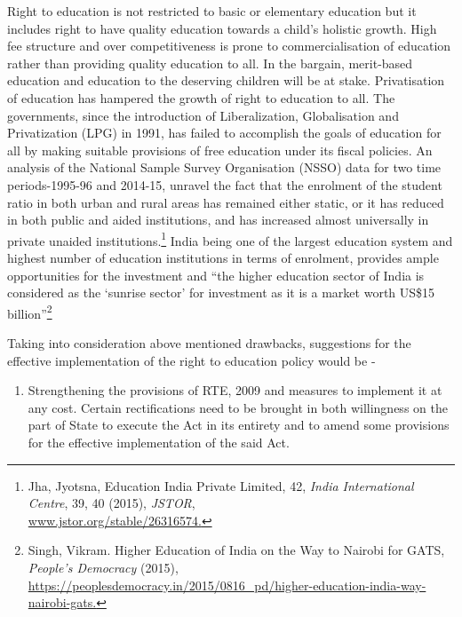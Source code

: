\begin{multicols}{2}
\vspace{-.1cm}


\vspace{-.1cm}

\noi
Right to education is not restricted to basic or elementary education but it includes right to
have quality education towards a child’s holistic growth. High fee structure and over
competitiveness is prone to commercialisation of education rather than providing quality
education to all. In the bargain, merit-based education and education to the deserving children
will be at stake. Privatisation of education has hampered the growth of right to education to
all. The governments, since the introduction of Liberalization, Globalisation and Privatization
(LPG) in 1991, has failed to accomplish the goals of education for all by making suitable
provisions of free education under its fiscal policies. An analysis of the National Sample
Survey Organisation (NSSO) data for two time periods-1995-96 and 2014-15, unravel the
fact that the enrolment of the student ratio in both urban and rural areas has remained either
static, or it has reduced in both public and aided institutions, and has increased almost
universally in private unaided institutions.\footnote{Jha, Jyotsna, Education India Private Limited, 42, \textit{India International Centre}, 39, 40 (2015), \textit{JSTOR},\\ \url{www.jstor.org/stable/26316574.}} India being one of the largest education system and highest number of education institutions in terms of enrolment, provides ample
opportunities for the investment and “the higher education sector of India is considered as the
‘sunrise sector’ for investment as it is a market worth US\$15 billion”\footnote{Singh, Vikram. Higher Education of India on the Way to Nairobi for GATS, \textit{People’s Democracy} (2015),\\ \url{https://peoplesdemocracy.in/2015/0816_pd/higher-education-india-way-nairobi-gats.}}



\noi
Taking into consideration above mentioned drawbacks, suggestions for the effective
implementation of the right to education policy would be -

\begin{enumerate}[label=$-$]
\itemsep=0pt
\item Strengthening the provisions of RTE, 2009 and measures to implement it at any
cost. Certain rectifications need to be brought in both willingness on the part of
State to execute the Act in its entirety and to amend some provisions for the
effective implementation of the said Act.


\end{enumerate}
\end{multicols}
